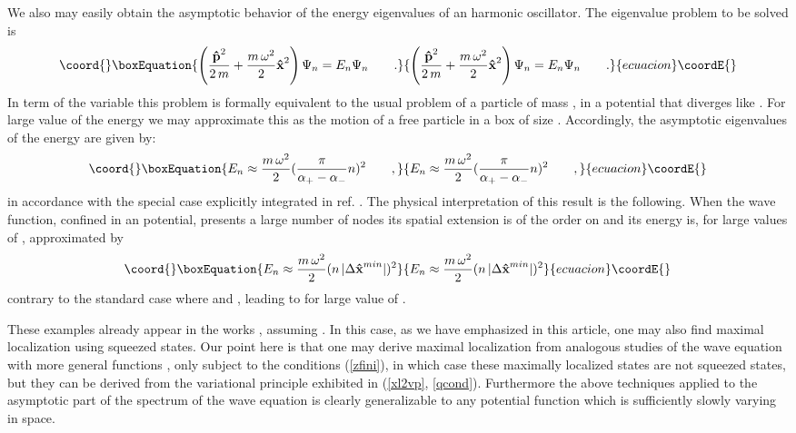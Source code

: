 \documentclass[a4paper,10pt]{article}
\providecommand{\x}{\mbox{\rm{\bf \^ x}}}
\providecommand{\p}{\mbox{\rm{\bf \^ p}}}
\begin{document}
We also may easily obtain the asymptotic behavior of the energy
eigenvalues of an harmonic oscillator. The eigenvalue problem to
be solved is
\begin{equation}\coord{}\boxEquation{
\left(\frac{\p^2}{2\,m}+\frac{m\,\omega^2}2\x^2\right)\Psi_n
=E_n\Psi_n\qquad .
}{
\left(\frac{\p^2}{2\,m}+\frac{m\,\omega^2}2\x^2\right)\Psi_n
=E_n\Psi_n\qquad .
}{ecuacion}\coordE{}\end{equation}
In term of the \coordHE{} variable this problem is formally equivalent to
the usual problem of a particle of mass \coordHE{}, in a
potential that diverges like \coordHE{}. For large
value of the energy \coordHE{} we may approximate this as the motion of
a free particle in a box of size \myHighlight{$\alpha_+-\alpha_-$}\coordHE{}. Accordingly,
the asymptotic eigenvalues of the energy are given by:
\begin{equation}\coord{}\boxEquation{
E_n\approx\frac{m\,\omega^2}2(\frac
\pi{\alpha_+-\alpha_-}n)^2\qquad,
}{
E_n\approx\frac{m\,\omega^2}2(\frac
\pi{\alpha_+-\alpha_-}n)^2\qquad,
}{ecuacion}\coordE{}\end{equation}
in accordance with the special case explicitly integrated in ref.
\cite{K2}. The physical interpretation of this result \cite{RB} is
the following. When the wave function, confined in an \coordHE{}
potential, presents a large number \coordHE{} of nodes its spatial
extension is of the order on \myHighlight{$n\, |\Delta \x^{min}|=n\, \frac
\pi{\alpha_+-\alpha_-}$}\coordHE{} and its energy is, for large values of
\coordHE{}, approximated by
\begin{equation}\coord{}\boxEquation{
E_n\approx\frac{m\,\omega^2}2(n\, |\Delta \x^{min}|)^2
}{
E_n\approx\frac{m\,\omega^2}2(n\, |\Delta \x^{min}|)^2
}{ecuacion}\coordE{}\end{equation}
contrary to the standard case where \myHighlight{$\Delta \x =\sqrt{\x^2}\approx
n/\Delta\p|$}\coordHE{} and \myHighlight{$\Delta\p^2=\p^2\approx m\,E_n$}\coordHE{}, leading to
\coordHE{} for large value of \coordHE{}.

These examples already appear in the works \cite{BGLS, K2},
assuming \coordHE{}. In this case, as we have emphasized in this
article, one may also find maximal localization using squeezed
states. Our point here is that one may derive maximal localization
from analogous studies of the wave equation with more general
functions \coordHE{}, only subject to the conditions (\ref{zfini}), in
which case these maximally localized states are not squeezed
states, but they can be derived from the variational principle
exhibited in (\ref{xl2vp}, \ref{qcond}). Furthermore the above
techniques applied to the asymptotic part of the spectrum of the
wave equation is clearly generalizable to any potential function
which is sufficiently slowly varying in \coordHE{} space.
\end{document}
